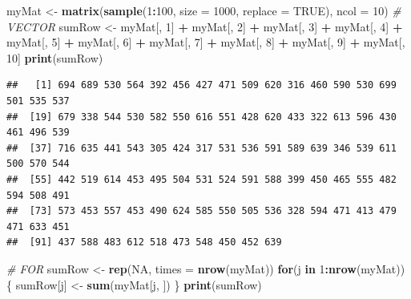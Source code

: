 \documentclass[
]{book}
\newenvironment{Shaded}{\begin{snugshade}}{\end{snugshade}}
\newcommand{\CommentTok}[1]{\textcolor[rgb]{0.56,0.35,0.01}{\textit{#1}}}
\newcommand{\ControlFlowTok}[1]{\textcolor[rgb]{0.13,0.29,0.53}{\textbf{#1}}}
\newcommand{\DataTypeTok}[1]{\textcolor[rgb]{0.13,0.29,0.53}{#1}}
\newcommand{\DecValTok}[1]{\textcolor[rgb]{0.00,0.00,0.81}{#1}}
\newcommand{\KeywordTok}[1]{\textcolor[rgb]{0.13,0.29,0.53}{\textbf{#1}}}
\newcommand{\NormalTok}[1]{#1}
\newcommand{\OperatorTok}[1]{\textcolor[rgb]{0.81,0.36,0.00}{\textbf{#1}}}
\newcommand{\OtherTok}[1]{\textcolor[rgb]{0.56,0.35,0.01}{#1}}
\newcommand{\StringTok}[1]{\textcolor[rgb]{0.31,0.60,0.02}{#1}}
\begin{document}
\begin{Shaded}
\begin{Highlighting}[]
\NormalTok{myMat <-}\StringTok{ }\KeywordTok{matrix}\NormalTok{(}\KeywordTok{sample}\NormalTok{(}\DecValTok{1}\OperatorTok{:}\DecValTok{100}\NormalTok{, }\DataTypeTok{size =} \DecValTok{1000}\NormalTok{, }\DataTypeTok{replace =} \OtherTok{TRUE}\NormalTok{), }\DataTypeTok{ncol =} \DecValTok{10}\NormalTok{)}
\CommentTok{# VECTOR}
\NormalTok{sumRow <-}\StringTok{ }\NormalTok{myMat[, }\DecValTok{1}\NormalTok{] }\OperatorTok{+}\StringTok{ }\NormalTok{myMat[, }\DecValTok{2}\NormalTok{] }\OperatorTok{+}\StringTok{ }\NormalTok{myMat[, }\DecValTok{3}\NormalTok{] }\OperatorTok{+}\StringTok{ }\NormalTok{myMat[, }\DecValTok{4}\NormalTok{] }\OperatorTok{+}\StringTok{ }
\StringTok{  }\NormalTok{myMat[, }\DecValTok{5}\NormalTok{] }\OperatorTok{+}\StringTok{ }\NormalTok{myMat[, }\DecValTok{6}\NormalTok{] }\OperatorTok{+}\StringTok{ }\NormalTok{myMat[, }\DecValTok{7}\NormalTok{] }\OperatorTok{+}\StringTok{ }\NormalTok{myMat[, }\DecValTok{8}\NormalTok{] }\OperatorTok{+}\StringTok{ }
\StringTok{  }\NormalTok{myMat[, }\DecValTok{9}\NormalTok{] }\OperatorTok{+}\StringTok{ }\NormalTok{myMat[, }\DecValTok{10}\NormalTok{]}
\KeywordTok{print}\NormalTok{(sumRow)}
\end{Highlighting}
\end{Shaded}

\begin{verbatim}
##   [1] 694 689 530 564 392 456 427 471 509 620 316 460 590 530 699 501 535 537
##  [19] 679 338 544 530 582 550 616 551 428 620 433 322 613 596 430 461 496 539
##  [37] 716 635 441 543 305 424 317 531 536 591 589 639 346 539 611 500 570 544
##  [55] 442 519 614 453 495 504 531 524 591 588 399 450 465 555 482 594 508 491
##  [73] 573 453 557 453 490 624 585 550 505 536 328 594 471 413 479 471 633 451
##  [91] 437 588 483 612 518 473 548 450 452 639
\end{verbatim}

\begin{Shaded}
\begin{Highlighting}[]
\CommentTok{# FOR}
\NormalTok{sumRow <-}\StringTok{ }\KeywordTok{rep}\NormalTok{(}\OtherTok{NA}\NormalTok{, }\DataTypeTok{times =} \KeywordTok{nrow}\NormalTok{(myMat))}
\ControlFlowTok{for}\NormalTok{(j }\ControlFlowTok{in} \DecValTok{1}\OperatorTok{:}\KeywordTok{nrow}\NormalTok{(myMat))\{}
\NormalTok{  sumRow[j] <-}\StringTok{ }\KeywordTok{sum}\NormalTok{(myMat[j, ])}
\NormalTok{\}}
\KeywordTok{print}\NormalTok{(sumRow)}
\end{Highlighting}
\end{Shaded}
\end{document}
